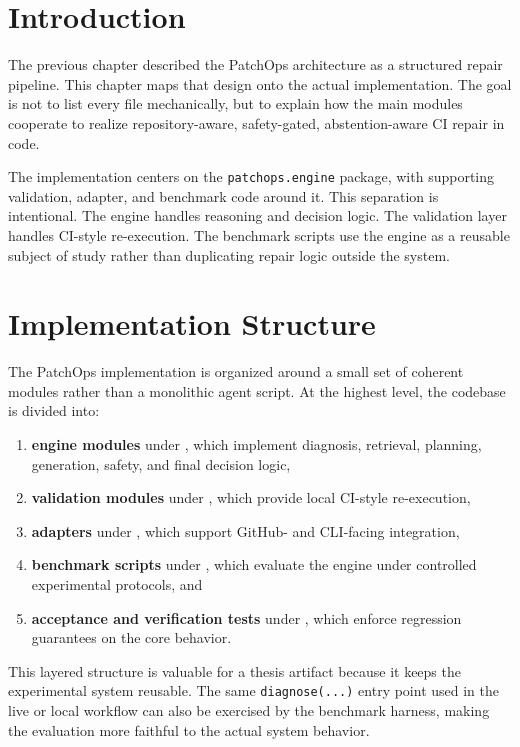 \section{Introduction}

The previous chapter described the PatchOps architecture as a structured repair pipeline. This chapter maps that
design onto the actual implementation. The goal is not to list every file mechanically, but to explain how the
main modules cooperate to realize repository-aware, safety-gated, abstention-aware CI repair in code.

The implementation centers on the \texttt{patchops.engine} package, with supporting validation, adapter, and
benchmark code around it. This separation is intentional. The engine handles reasoning and decision logic. The
validation layer handles CI-style re-execution. The benchmark scripts use the engine as a reusable subject of
study rather than duplicating repair logic outside the system.

\section{Implementation Structure}

The PatchOps implementation is organized around a small set of coherent modules rather than a monolithic agent
script. At the highest level, the codebase is divided into:

\begin{enumerate}
\item \textbf{engine modules} under , which implement diagnosis, retrieval, planning,
generation, safety, and final decision logic,
\item \textbf{validation modules} under , which provide local CI-style
re-execution,
\item \textbf{adapters} under , which support GitHub- and CLI-facing integration,
\item \textbf{benchmark scripts} under , which evaluate the engine under controlled
experimental protocols, and
\item \textbf{acceptance and verification tests} under , which enforce regression guarantees on
the core behavior.
\end{enumerate}

This layered structure is valuable for a thesis artifact because it keeps the experimental system reusable. The
same \texttt{diagnose(...)} entry point used in the live or local workflow can also be exercised by the
benchmark harness, making the evaluation more faithful to the actual system behavior.

